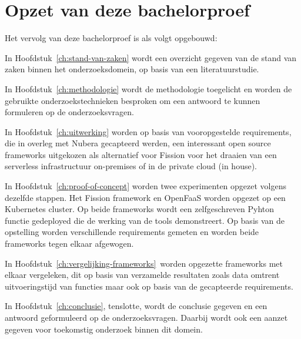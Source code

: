 \section{Opzet van deze bachelorproef}
\label{sec:opzet-bachelorproef}

Het vervolg van deze bachelorproef is als volgt opgebouwd:

In Hoofdstuk~\ref{ch:stand-van-zaken} wordt een overzicht gegeven van de stand van zaken binnen het onderzoeksdomein, op basis van een literatuurstudie.

In Hoofdstuk~\ref{ch:methodologie} wordt de methodologie toegelicht en worden de gebruikte onderzoekstechnieken besproken om een antwoord te kunnen formuleren op de onderzoeksvragen.

In Hoofdstuk~\ref{ch:uitwerking} worden op basis van vooropgestelde requirements, die in overleg met Nubera gecapteerd werden, een interessant open source frameworks uitgekozen als alternatief voor Fission voor het draaien van een serverless infrastructuur on-premises of in de private cloud (in house).

In Hoofdstuk~\ref{ch:proof-of-concept} worden twee experimenten opgezet volgens dezelfde stappen. Het Fission framework en OpenFaaS worden opgezet op een Kubernetes cluster. Op beide frameworks wordt een zelfgeschreven Pyhton functie gedeployed die de werking van de tools demonstreert. Op basis van de opstelling worden verschillende requirements gemeten en worden beide frameworks tegen elkaar afgewogen.

In Hoofdstuk~\ref{ch:vergelijking-frameworks} worden opgezette frameworks met elkaar vergeleken, dit op basis van verzamelde resultaten zoals data omtrent uitvoeringstijd van functies maar ook op basis van de gecapteerde requirements.

In Hoofdstuk~\ref{ch:conclusie}, tenslotte, wordt de conclusie gegeven en een antwoord geformuleerd op de onderzoeksvragen. Daarbij wordt ook een aanzet gegeven voor toekomstig onderzoek binnen dit domein.

